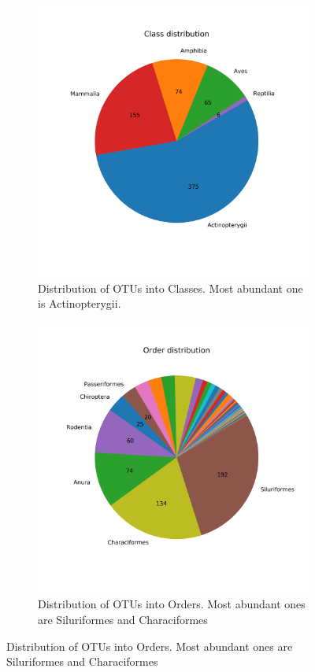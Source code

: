 \begin{figure}[h]
	\centering
	\begin{subfigure}{0.45\textwidth}
		\includegraphics[width=\textwidth]{classdistrpie}
		\caption{Distribution of OTUs into Classes. Most abundant one is Actinopterygii.}
		\label{fig:classpie}
	\end{subfigure}
	\begin{subfigure}{0.45\textwidth}
		\includegraphics[width=\textwidth]{orderdistrpie}
		\caption{Distribution of OTUs into Orders. Most abundant ones are Siluriformes and Characiformes}
		\label{fig:orderpie}
	\end{subfigure}
\label{fig:distr}
\end{figure}

